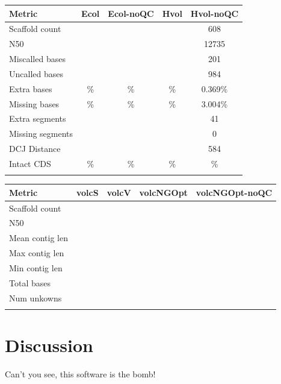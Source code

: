 \documentclass{bioinfo}
\begin{document}
\begin{table}[!t]
{\begin{tabular}{l|cccc}\toprule
Metric            & Ecol & Ecol-noQC & Hvol & Hvol-noQC\\\midrule
Scaffold count    &  &  &  & 608 \\
N50               &  &  &  & 12735   \\
Miscalled bases   &  &  &  & 201 \\
Uncalled bases    &  &  &  & 984 \\
Extra bases       & \% & \% & \% & 0.369\% \\
Missing bases     & \% & \% & \% & 3.004\% \\
Extra segments    &  & & & 41 \\
Missing segments  &  & & & 0 \\
DCJ Distance      &  & & & 584 \\
Intact CDS        & \% & \% & \% & \% \\
\botrule \\
\end{tabular}}{}
\end{table}


\begin{table}[!t]
{\begin{tabular}{l|cccc}\toprule
Metric           &  volcS & volcV & volcNGOpt & volcNGOpt-noQC\\\midrule
Scaffold count   & & & & \\
N50              & & & & \\
Mean contig len  & & & & \\
Max contig len   & & & & \\
Min contig len   & & & & \\
Total bases      & & & & \\
Num unkowns      & & & & \\
\botrule \\
\end{tabular}}{}
\end{table}

\section{Discussion}

Can't you see, this software is the bomb!
\end{document}

